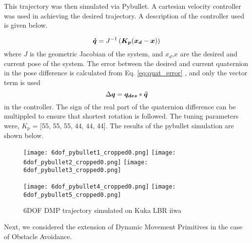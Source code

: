 

This trajectory was then simulated via Pybullet. A cartesian velocity controller was used in achieving the desired trajectory.
A description of the controller used is given below.

\begin{equation}
    \boldsymbol{\dot{q}} = J^{-1} \left( \boldsymbol{K_p} (\boldsymbol{x_d} - \boldsymbol{x}) \right)
\end{equation}
where $J$ is the geometric Jacobian of the system, and $x_d$,$x$ are the desired and current pose of the system. The error 
between the desired and current quaternion in the pose difference is calculated from Eq. \ref{eq:quat_error} , and only the vector term is used
\begin{equation}\label{eq:quat_error}
    \Delta \boldsymbol{q} = \boldsymbol{q_{des}} * \boldsymbol{\bar{q}}
\end{equation}
in the controller. The sign of the real part of the quaternion difference can be multippled to ensure that shortest rotation is followed.
The tuning parameters were, $K_p$ = [55, 55, 55, 44, 44, 44].
The results of the pybullet simulation are shown below.

\begin{figure}[h]
    \centering
    \texttt{[image: 6dof\_pybullet1\_cropped0.png]}\quad
    \texttt{[image: 6dof\_pybullet2\_cropped0.png]}\quad
    \texttt{[image: 6dof\_pybullet3\_cropped0.png]}

    \medskip

    \texttt{[image: 6dof\_pybullet4\_cropped0.png]}\quad
    \texttt{[image: 6dof\_pybullet5\_cropped0.png]}

    \caption{6DOF DMP trajectory simulated on Kuka LBR iiwa }
    \label{fig:6DOF_traj_pybullet}
\end{figure}

Next, we considered the extension of Dynamic Movement Primitives in the case of Obstacle Avoidance.






















